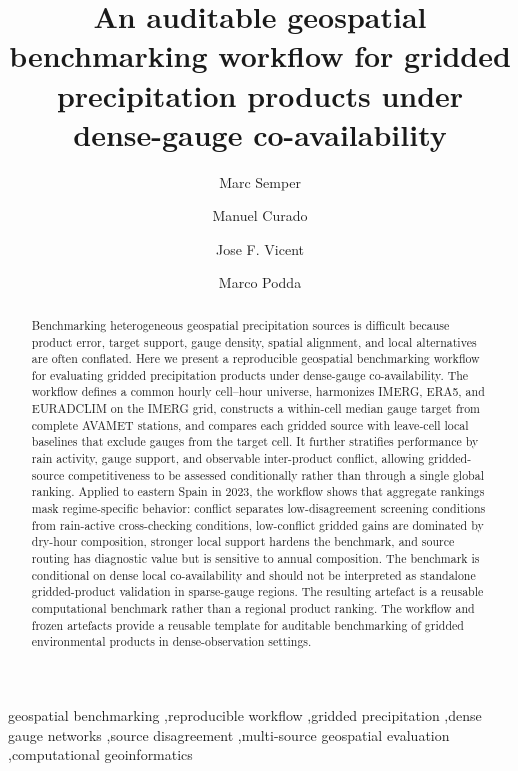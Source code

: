 \documentclass[preprint,12pt]{elsarticle}
\begin{document}
\begin{frontmatter}

\title{An auditable geospatial benchmarking workflow for gridded precipitation products under dense-gauge co-availability}

\author[ua]{Marc Semper}
\author[ua]{Manuel Curado}
\author[ua]{Jose F. Vicent}
\author[ps]{Marco Podda}

\address[ua]{Department of Computer Science and Artificial Intelligence, University of Alicante, Campus de San Vicente del Raspeig, Ap. Correos 99, E-03080 Alicante, Spain.}

\address[ps]{Department of Computer Science, University of Pisa, Largo Bruno Pontecorvo, 3, 56127 Pisa, Italy.}




\begin{abstract}
Benchmarking heterogeneous geospatial precipitation sources is difficult because product error, target support, gauge density, spatial alignment, and local alternatives are often conflated. Here we present a reproducible geospatial benchmarking workflow for evaluating gridded precipitation products under dense-gauge co-availability. The workflow defines a common hourly cell--hour universe, harmonizes IMERG, ERA5, and EURADCLIM on the IMERG grid, constructs a within-cell median gauge target from complete AVAMET stations, and compares each gridded source with leave-cell local baselines that exclude gauges from the target cell. It further stratifies performance by rain activity, gauge support, and observable inter-product conflict, allowing gridded-source competitiveness to be assessed conditionally rather than through a single global ranking. Applied to eastern Spain in 2023, the workflow shows that aggregate rankings mask regime-specific behavior: conflict separates low-disagreement screening conditions from rain-active cross-checking conditions, low-conflict gridded gains are dominated by dry-hour composition, stronger local support hardens the benchmark, and source routing has diagnostic value but is sensitive to annual composition. The benchmark is conditional on dense local co-availability and should not be interpreted as standalone gridded-product validation in sparse-gauge regions. The resulting artefact is a reusable computational benchmark rather than a regional product ranking. The workflow and frozen artefacts provide a reusable template for auditable benchmarking of gridded environmental products in dense-observation settings.
\end{abstract}

\begin{keyword}
geospatial benchmarking \sep reproducible workflow \sep gridded precipitation \sep dense gauge networks \sep source disagreement \sep multi-source geospatial evaluation \sep computational geoinformatics
\end{keyword}

\end{frontmatter}
\end{document}
